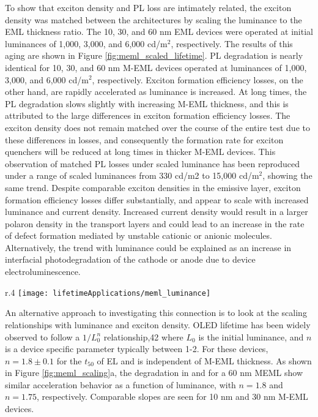 \documentclass[../thesis.tex]{subfiles}
\begin{document}
To show that exciton density and PL loss are intimately related, the exciton density was matched between the architectures by scaling the luminance to the EML thickness ratio.  
The 10, 30, and 60 nm EML devices were operated at initial luminances of 1,000, 3,000, and 6,000 cd/m$^2$, respectively.
The results of this aging are shown in Figure \ref{fig:meml_scaled_lifetime}.
PL degradation is nearly identical for 10, 30, and 60 nm M-EML devices operated at luminances of 1,000, 3,000, and 6,000 cd/m$^2$, respectively. 
Exciton formation efficiency losses, on the other hand, are rapidly accelerated as luminance is increased. 
At long times, the PL degradation slows slightly with increasing M-EML thickness, and this is attributed to the large differences in exciton formation efficiency losses. 
The exciton density does not remain matched over the course of the entire test due to these differences in \ef losses, and consequently the formation rate for exciton quenchers will be reduced at long times in thicker M-EML devices. 
This observation of matched PL losses under scaled luminance has been reproduced under a range of scaled luminances from 330 cd/m2 to 15,000 cd/m$^2$, showing the same trend. 
Despite comparable exciton densities in the emissive layer, exciton formation efficiency losses differ substantially, and appear to scale with increased luminance and current density. 
Increased current density would result in a larger polaron density in the transport layers and could lead to an increase in the rate of defect formation mediated by unstable cationic or anionic molecules.
Alternatively, the trend with luminance could be explained as an increase in interfacial photodegradation of the cathode or anode due to device electroluminescence.\supercite{Wang2012,Wang2010a,wang2012}

\begin{wrapfigure}{r}{.4\textwidth}
\centering
\texttt{[image: lifetimeApplications/meml\_luminance]}
\caption{Scaling behavior of \pl and \ef as a function of a) luminance and b) exciton density.}
\label{fig:meml_scaling}
\end{wrapfigure}


An alternative approach to investigating this connection is to look at the scaling relationships with luminance and exciton density.
OLED lifetime has been widely observed to follow a $1/L_0^n$ relationship,42 where $L_0$ is the initial luminance, and $n$ is a device specific parameter typically between 1-2. 
For these devices, $n = 1.8 \pm 0.1$ for the $t_{50}$ of EL and is independent of M-EML thickness. 
As shown in Figure \ref{fig:meml_scaling}a, the degradation in \pl and \ef for a 60 nm MEML show similar acceleration behavior as a function of luminance, with $n = 1.8$ and $n = 1.75$, respectively. 
Comparable slopes are seen for 10 nm and 30 nm M-EML devices. 
\end{document}
